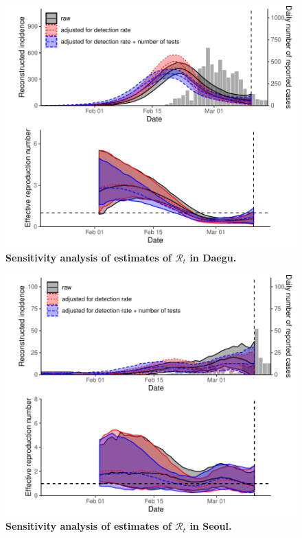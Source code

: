 \documentclass[12pt]{article}
\begin{document}
\pagebreak

\begin{figure}[!ht]
\includegraphics[width=\textwidth]{figure_R_t_daegu.pdf}
\caption{
\textbf{Sensitivity analysis of estimates of $\mathcal R_t$ in Daegu.}
}
\end{figure}

\pagebreak

\begin{figure}[!ht]
\includegraphics[width=\textwidth]{figure_R_t_seoul.pdf}
\caption{
\textbf{Sensitivity analysis of estimates of $\mathcal R_t$ in Seoul.}
}
\end{figure}
\end{document}

